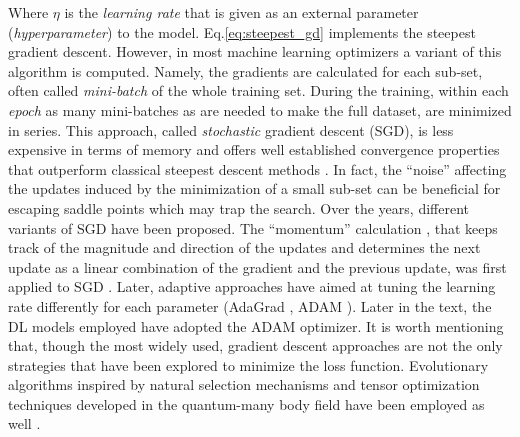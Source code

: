 Where $\eta$ is the \textit{learning rate} that is given as an external parameter (\textit{hyperparameter}) to the model. 
Eq.\ref{eq:steepest_gd} implements the steepest gradient descent. However, in most machine learning optimizers a variant 
of this algorithm is computed. Namely, the gradients are calculated for each sub-set, often called \textit{mini-batch} of the 
whole training set. During the training, within each \textit{epoch} as many mini-batches as are needed to make the full 
dataset, are minimized in series. This approach, called \textit{stochastic} gradient descent (SGD), is less expensive 
in terms of memory and offers well established convergence properties that outperform classical steepest descent methods 
\cite{Zhao2021_sgd}. In fact, the ``noise'' affecting the updates induced by the minimization of a small sub-set can be beneficial 
for escaping saddle points which may trap the search. 
Over the years, different variants of SGD have been proposed. The ``momentum'' calculation \cite{Polyak1964}, 
that keeps track of the magnitude and direction of the updates and determines the next update as a linear combination 
of the gradient and the previous update, was first applied to SGD \cite{Backpro_1986}. Later, adaptive approaches 
have aimed at tuning the learning rate differently for each parameter (AdaGrad \cite{Adagrad}, ADAM \cite{ADAM}).
Later in the text, the DL models employed have adopted the ADAM optimizer. 
It is worth mentioning that, though the most widely used, gradient descent approaches are not the only strategies that 
have been explored to minimize the loss function. Evolutionary algorithms inspired by natural selection mechanisms and 
tensor optimization techniques developed in the quantum-many body field have been employed as well \cite{EA_1999, DMRG_Stoudenmire}.


